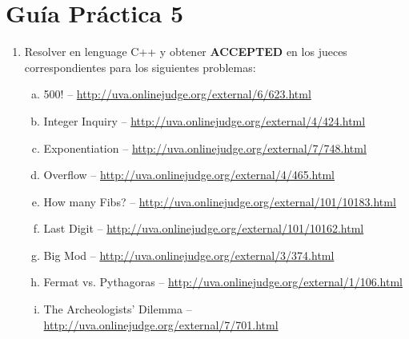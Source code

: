 




\section*{Gu\'ia Pr\'actica 5}

\begin{enumerate}[1 -]
	
	\item Resolver en lenguage C++ y obtener \textbf{ACCEPTED} en los jueces correspondientes para los siguientes problemas:
	
	\begin{enumerate}[a)]
		\item 500! -- \href{http://uva.onlinejudge.org/external/6/623.html}{http://uva.onlinejudge.org/external/6/623.html}
		\item Integer Inquiry -- \href{http://uva.onlinejudge.org/external/4/424.html}{http://uva.onlinejudge.org/external/4/424.html}
		\item Exponentiation -- \href{http://uva.onlinejudge.org/external/7/748.html}{http://uva.onlinejudge.org/external/7/748.html}
		\item Overflow -- \href{http://uva.onlinejudge.org/external/4/465.html}{http://uva.onlinejudge.org/external/4/465.html}
		\item How many Fibs? -- \href{http://uva.onlinejudge.org/external/101/10183.html}{http://uva.onlinejudge.org/external/101/10183.html}
		\item Last Digit -- \href{http://uva.onlinejudge.org/external/101/10162.html}{http://uva.onlinejudge.org/external/101/10162.html}
		\item Big Mod -- \href{http://uva.onlinejudge.org/external/3/374.html}{http://uva.onlinejudge.org/external/3/374.html}
		\item Fermat vs. Pythagoras -- \href{http://uva.onlinejudge.org/external/1/106.html}{http://uva.onlinejudge.org/external/1/106.html}
		\item The Archeologists’ Dilemma -- \href{http://uva.onlinejudge.org/external/7/701.html}{http://uva.onlinejudge.org/external/7/701.html}														
	\end{enumerate}

\end{enumerate}






